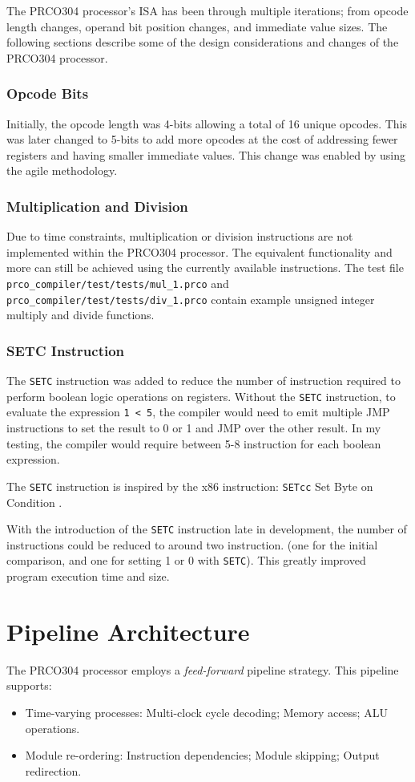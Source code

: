 \documentclass[11pt,a4paper]{report}
\newcommand{\scname}{PRCO304}
\begin{document}
The \scname{} processor's ISA has been through multiple iterations; from opcode length changes, operand bit position changes, and immediate value sizes. The following sections describe some of the design considerations and changes of the \scname{} processor.

\subsubsection*{Opcode Bits} 
Initially, the opcode length was 4-bits allowing a total of 16 unique opcodes. This was later changed to 5-bits to add more opcodes at the cost of addressing fewer registers and having smaller immediate values. This change was enabled by using the agile methodology.

\subsubsection*{Multiplication and Division}
Due to time constraints, multiplication or division instructions are not implemented within the \scname{} processor. The equivalent functionality and more can still be achieved using the currently available instructions. The test file \verb|prco_compiler/test/tests/mul_1.prco| and \verb|prco_compiler/test/tests/div_1.prco| contain example unsigned integer multiply and divide functions.

\subsubsection*{SETC Instruction}
\label{setc}
The \verb|SETC| instruction was added to reduce the number of instruction required to perform boolean logic operations on registers. Without the \verb|SETC| instruction, to evaluate the expression \texttt{1 < 5}, the compiler would need to emit multiple JMP instructions to set the result to 0 or 1 and JMP over the other result. In my testing, the compiler would require between 5-8 instruction for each boolean expression. 

The \verb|SETC| instruction is inspired by the x86 instruction: \verb|SETcc| Set Byte on Condition \cite{isa_x86}.

With the introduction of the \verb|SETC| instruction late in development, the number of instructions could be reduced to around two instruction. (one for the initial comparison, and one for setting 1 or 0 with \verb|SETC|). This greatly improved program execution time and size.


\section{Pipeline Architecture}
\label{core:pipeline}
The \scname{} processor employs a \textit{feed-forward} pipeline strategy. 
This pipeline supports:
\begin{itemize}
\item{Time-varying processes: Multi-clock cycle decoding; Memory access; ALU operations.}
\item{Module re-ordering: Instruction dependencies; Module skipping; Output redirection.}
\end{itemize}
\end{document}
